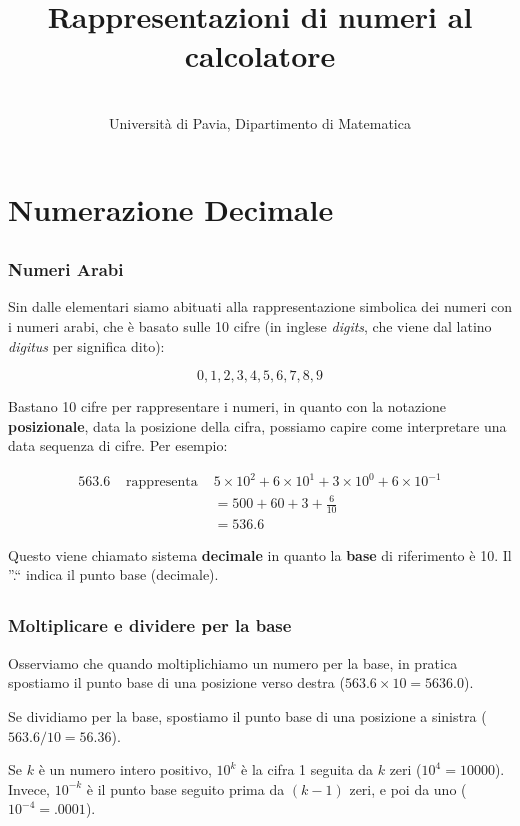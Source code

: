 \documentclass[xcolor={table}]{beamer}
\title[Programmazione 1]{Rappresentazioni di numeri al calcolatore}
\author{\tb{Stefano Gualandi}\\ \small{Universit\`a di Pavia, Dipartimento di Matematica}}
\date{}
\institute{
   \begin{tabular}{ll}
   email:   & {\tt stefano.gualandi@unipv.it} \\
   twitter: & {\tt @famo2spaghi} \\ 
   blog:    & {\tt http://stegua.github.com}
\end{tabular}
}
\begin{document}
\frame{\titlepage}

\section {Numerazione Decimale}
\subsection{}
\begin{frame}
   \frametitle{Numeri Arabi}
  
	Sin dalle elementari siamo abituati alla rappresentazione simbolica dei numeri con i numeri arabi, 
	che è basato sulle 10 cifre (in inglese {\it digits}, che viene dal latino {\it digitus} per significa dito):
	
	$$0,1,2,3,4,5,6,7,8,9$$
	
	Bastano 10 cifre per rappresentare i numeri, in quanto con la notazione {\bf posizionale},
	data la posizione della cifra, possiamo capire come interpretare una data sequenza di cifre.
	Per esempio:
	
	\begin{eqnarray*}
	563.6 &\mbox{ rappresenta }& 5 \times 10^2 + 6 \times 10^1 + 3 \times 10^0 + 6 \times 10^{-1} \\
	&&= 500 + 60 + 3 + \frac{6}{10}\\
	&&= 536.6
	\end{eqnarray*}
	
	Questo viene chiamato sistema {\bf decimale} in quanto la {\bf base} di riferimento è 10.
	Il ''.`` indica il punto base (decimale).
\end{frame}

\subsection{}
\begin{frame}
   \frametitle{Moltiplicare e dividere per la base}
   
   Osserviamo che quando moltiplichiamo un numero per la base, in pratica spostiamo il punto base
   di una posizione verso destra ($563.6 \times 10=5636.0$).
   
   \bigskip
   Se dividiamo per la base, spostiamo il punto base di una posizione a sinistra ($563.6 / 10=56.36$).
   
   \bigskip
   Se $k$ è un numero intero positivo, $10^k$ è la cifra 1 seguita da $k$ zeri ($10^4=10000$).
   Invece, $10^{-k}$ è il punto base seguito prima da $(k-1)$ zeri, e poi da uno ($10^{-4}=.0001$). 

\end{frame}
\end{document}
